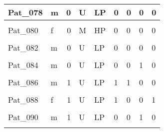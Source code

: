 \documentclass[11pt, a4paper, twosided]{book}
\begin{document}
\begin{longtable}[t]{l|l|r|l|l|l|l|l|l}
\hline
Pat\_078 & m & 0 & U & LP & 0 & 0 & 0 & 0\\
\hline
\cellcolor[HTML]{E2E868}{Pat\_079} & \cellcolor[HTML]{E2E868}{m} & \cellcolor[HTML]{E2E868}{0} & \cellcolor[HTML]{E2E868}{M} & \cellcolor[HTML]{E2E868}{HP} & \cellcolor[HTML]{E2E868}{1} & \cellcolor[HTML]{E2E868}{0} & \cellcolor[HTML]{E2E868}{0} & \cellcolor[HTML]{E2E868}{0}\\
\hline
Pat\_080 & f & 0 & M & HP & 0 & 0 & 0 & 0\\
\hline
\cellcolor[HTML]{E2E868}{Pat\_081} & \cellcolor[HTML]{E2E868}{m} & \cellcolor[HTML]{E2E868}{0} & \cellcolor[HTML]{E2E868}{M} & \cellcolor[HTML]{E2E868}{HP} & \cellcolor[HTML]{E2E868}{0} & \cellcolor[HTML]{E2E868}{0} & \cellcolor[HTML]{E2E868}{0} & \cellcolor[HTML]{E2E868}{0}\\
\hline
Pat\_082 & m & 0 & U & LP & 0 & 0 & 0 & 0\\
\hline
\cellcolor[HTML]{E2E868}{Pat\_083} & \cellcolor[HTML]{E2E868}{m} & \cellcolor[HTML]{E2E868}{0} & \cellcolor[HTML]{E2E868}{M} & \cellcolor[HTML]{E2E868}{HP} & \cellcolor[HTML]{E2E868}{0} & \cellcolor[HTML]{E2E868}{0} & \cellcolor[HTML]{E2E868}{0} & \cellcolor[HTML]{E2E868}{0}\\
\hline
Pat\_084 & m & 0 & U & LP & 0 & 0 & 1 & 0\\
\hline
\cellcolor[HTML]{E2E868}{Pat\_085} & \cellcolor[HTML]{E2E868}{m} & \cellcolor[HTML]{E2E868}{0} & \cellcolor[HTML]{E2E868}{M} & \cellcolor[HTML]{E2E868}{HP} & \cellcolor[HTML]{E2E868}{0} & \cellcolor[HTML]{E2E868}{0} & \cellcolor[HTML]{E2E868}{0} & \cellcolor[HTML]{E2E868}{0}\\
\hline
Pat\_086 & m & 1 & U & LP & 1 & 1 & 0 & 0\\
\hline
\cellcolor[HTML]{E2E868}{Pat\_087} & \cellcolor[HTML]{E2E868}{m} & \cellcolor[HTML]{E2E868}{0} & \cellcolor[HTML]{E2E868}{M} & \cellcolor[HTML]{E2E868}{IP} & \cellcolor[HTML]{E2E868}{1} & \cellcolor[HTML]{E2E868}{0} & \cellcolor[HTML]{E2E868}{0} & \cellcolor[HTML]{E2E868}{0}\\
\hline
Pat\_088 & f & 1 & U & LP & 1 & 0 & 0 & 1\\
\hline
\cellcolor[HTML]{E2E868}{Pat\_089} & \cellcolor[HTML]{E2E868}{m} & \cellcolor[HTML]{E2E868}{0} & \cellcolor[HTML]{E2E868}{M} & \cellcolor[HTML]{E2E868}{HP} & \cellcolor[HTML]{E2E868}{0} & \cellcolor[HTML]{E2E868}{0} & \cellcolor[HTML]{E2E868}{0} & \cellcolor[HTML]{E2E868}{0}\\
\hline
Pat\_090 & m & 1 & U & LP & 0 & 0 & 1 & 0\\
\hline
\cellcolor[HTML]{E2E868}{Pat\_091} & \cellcolor[HTML]{E2E868}{m} & \cellcolor[HTML]{E2E868}{1} & \cellcolor[HTML]{E2E868}{M} & \cellcolor[HTML]{E2E868}{NA} & \cellcolor[HTML]{E2E868}{1} & \cellcolor[HTML]{E2E868}{0} & \cellcolor[HTML]{E2E868}{0} & \cellcolor[HTML]{E2E868}{0}\\

\end{longtable}
\end{document}
